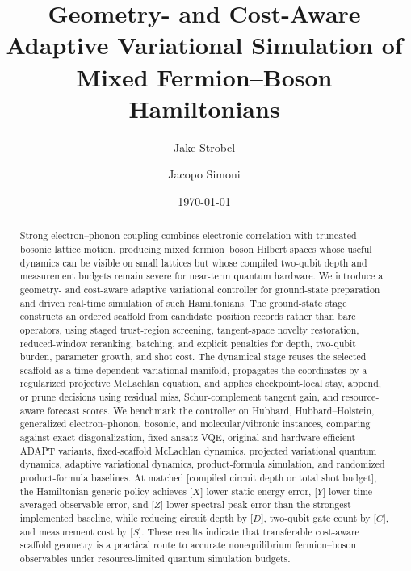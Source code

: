 \documentclass[
  reprint,
  amsmath,
  amssymb,
  aps,
  pra,
  nofootinbib,
  superscriptaddress,
  floatfix
]{revtex4-2}
\newcommand{\placeholder}[1]{\textcolor{red!70!black}{\ifmmode\left[#1\right]\else\textsf{[#1]}\fi}}
\begin{document}
\title{Geometry- and Cost-Aware Adaptive Variational Simulation of Mixed Fermion--Boson Hamiltonians}

\author{Jake Strobel}
\author{Jacopo Simoni}

\date{\today}

\begin{abstract}
Strong electron--phonon coupling combines electronic correlation with truncated bosonic lattice motion, producing mixed fermion--boson Hilbert spaces whose useful dynamics can be visible on small lattices but whose compiled two-qubit depth and measurement budgets remain severe for near-term quantum hardware. We introduce a geometry- and cost-aware adaptive variational controller for ground-state preparation and driven real-time simulation of such Hamiltonians. The ground-state stage constructs an ordered scaffold from candidate--position records rather than bare operators, using staged trust-region screening, tangent-space novelty restoration, reduced-window reranking, batching, and explicit penalties for depth, two-qubit burden, parameter growth, and shot cost. The dynamical stage reuses the selected scaffold as a time-dependent variational manifold, propagates the coordinates by a regularized projective McLachlan equation, and applies checkpoint-local stay, append, or prune decisions using residual miss, Schur-complement tangent gain, and resource-aware forecast scores. We benchmark the controller on Hubbard, Hubbard--Holstein, generalized electron--phonon, bosonic, and molecular/vibronic instances, comparing against exact diagonalization, fixed-ansatz VQE, original and hardware-efficient ADAPT variants, fixed-scaffold McLachlan dynamics, projected variational quantum dynamics, adaptive variational dynamics, product-formula simulation, and randomized product-formula baselines. At matched \placeholder{compiled circuit depth or total shot budget}, the Hamiltonian-generic policy achieves \placeholder{$X$} lower static energy error, \placeholder{$Y$} lower time-averaged observable error, and \placeholder{$Z$} lower spectral-peak error than the strongest implemented baseline, while reducing circuit depth by \placeholder{$D$}, two-qubit gate count by \placeholder{$C$}, and measurement cost by \placeholder{$S$}. These results indicate that transferable cost-aware scaffold geometry is a practical route to accurate nonequilibrium fermion--boson observables under resource-limited quantum simulation budgets.
\end{abstract}
\end{document}
